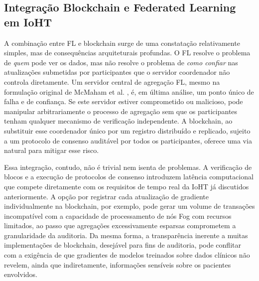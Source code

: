 \documentclass[12pt]{article}
\begin{document}
\subsection{Integração Blockchain e Federated Learning em IoHT}

A combinação entre FL e blockchain surge de uma constatação relativamente simples, mas de consequências arquiteturais profundas. O FL resolve o problema de \textit{quem} pode ver os dados, mas não resolve o problema de \textit{como confiar} nas atualizações submetidas por participantes que o servidor coordenador não controla diretamente. Um servidor central de agregação FL, mesmo na formulação original de McMaham et al. \cite{mcmahan2017communication}, é, em última análise, um ponto único de falha e de confiança. Se este servidor estiver comprometido ou malicioso, pode manipular arbitrariamente o processo de agregação sem que os participantes tenham qualquer mecanismo de verificação independente. A blockchain, ao substituir esse coordenador único por um registro distribuído e replicado, sujeito a um protocolo de consenso auditável por todos os participantes, oferece uma via natural para mitigar esse risco.

Essa integração, contudo, não é trivial nem isenta de problemas. A verificação de blocos e a execução de protocolos de consenso introduzem latência computacional que compete diretamente com os requisitos de tempo real da IoHT já discutidos anteriormente. A opção por registrar cada atualização de gradiente individualmente na blockchain, por exemplo, pode gerar um volume de transações incompatível com a capacidade de processamento de nós Fog com recursos limitados, ao passo que agregações excessivamente esparsas comprometem a granularidade da auditoria. Da mesma forma, a transparência inerente a muitas implementações de blockchain, desejável para fins de auditoria, pode conflitar com a exigência de que gradientes de modelos treinados sobre dados clínicos não revelem, ainda que indiretamente, informações sensíveis sobre os pacientes envolvidos.
\end{document}
